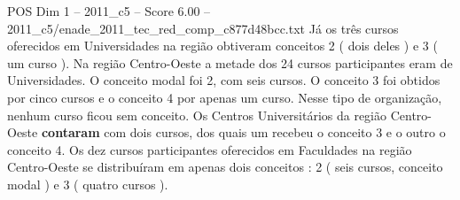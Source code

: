 \begin{textsample}{POS Dim 1 – 2011\_c5 – Score 6.00 – 2011\_c5/enade\_2011\_tec\_red\_comp\_c877d48bcc.txt}
Já os três cursos oferecidos em Universidades na região obtiveram conceitos 2 ( dois deles ) e 3 ( um curso ).
Na região Centro-Oeste a metade dos 24 cursos participantes eram de Universidades.
O conceito modal foi 2, com seis cursos.
O conceito 3 foi obtidos por cinco cursos e o conceito 4 por apenas um curso.
Nesse tipo de organização, nenhum curso ficou sem conceito.
Os Centros Universitários da região Centro-Oeste \textbf{contaram} com dois cursos, dos quais um recebeu o conceito 3 e o outro o conceito 4.
Os dez cursos participantes oferecidos em Faculdades na região Centro-Oeste se distribuíram em apenas dois conceitos : 2 ( seis cursos, conceito modal ) e 3 ( quatro cursos ).

\end{textsample}
